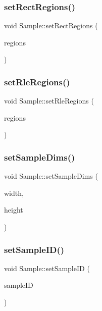 \subsubsection{\texorpdfstring{set\+Rect\+Regions()}{setRectRegions()}}
{\footnotesize\ttfamily void Sample\+::set\+Rect\+Regions (\begin{DoxyParamCaption}\item[{const \hyperlink{_rect_regions_8h_af395a1050a923eecf6862568feaf5d1d}{Rect\+Regions\+Ptr} \&}]{regions }\end{DoxyParamCaption})}

\mbox{\label{struct_sample_a6716c8c1e8fdcd00d66b2a959a79b507}} 
\subsubsection{\texorpdfstring{set\+Rle\+Regions()}{setRleRegions()}}
{\footnotesize\ttfamily void Sample\+::set\+Rle\+Regions (\begin{DoxyParamCaption}\item[{const \hyperlink{_rle_regions_8h_a9bcb41ed7094063e159a665178703e0f}{Rle\+Regions\+Ptr} \&}]{regions }\end{DoxyParamCaption})}

\mbox{\label{struct_sample_abf2406fa93155628a56b7087ff322ab4}} 
\subsubsection{\texorpdfstring{set\+Sample\+Dims()}{setSampleDims()}}
{\footnotesize\ttfamily void Sample\+::set\+Sample\+Dims (\begin{DoxyParamCaption}\item[{const int}]{width,  }\item[{const int}]{height }\end{DoxyParamCaption})}

\mbox{\label{struct_sample_a64fc306f85a0a1966f5f3b662efe95bb}} 
\subsubsection{\texorpdfstring{set\+Sample\+I\+D()}{setSampleID()}}
{\footnotesize\ttfamily void Sample\+::set\+Sample\+ID (\begin{DoxyParamCaption}\item[{const std\+::string \&}]{sample\+ID }\end{DoxyParamCaption})}

